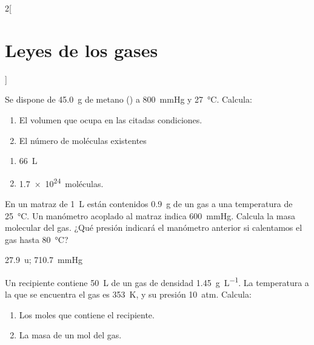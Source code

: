 \documentclass[10pt]{article}
\begin{document}
\begin{multicols}{2}[
  \section{Leyes de los gases}
  ]
  \begin{exercise}[
      tags    = {termodinámica, entalpía, entalpia de reacción, calor},
      topics  = {química, termoquímica, termodinámica},
      source  = {FQ 1B OXF 2015, p60, e22},
    ]
    Se dispone de \SI{45.0}{\gram} de metano () a \SI{800}{\mmHg} y \SI{27}{\celsius}. Calcula:
    \begin{enumerate}
      \item El volumen que ocupa en las citadas condiciones.
      \item El número de moléculas existentes
    \end{enumerate}
  \end{exercise}

  \begin{solution}
    \begin{enumerate}
      \item \SI{66}{\liter}
      \item \SI{1.7e24}{moléculas}.
    \end{enumerate}
  \end{solution}




  \begin{exercise}[
      tags    = {termodinámica, entalpía, entalpia de reacción, calor},
      topics  = {química, termoquímica, termodinámica},
      source  = {FQ 1B OXF 2015, p61, e24-25},
    ]
    En un matraz de \SI{1}{\liter} están contenidos \SI{0.9}{\gram} de un gas a una temperatura de \SI{25}{\celsius}. Un manómetro acoplado al matraz indica \SI{600}{\mmHg}. Calcula la masa  molecular del gas. ¿Qué presión indicará el manómetro anterior si calentamos el gas hasta \SI{80}{\celsius}?
  \end{exercise}

  \begin{solution}
    \SI{27.9}{u}; \SI{710.7}{\mmHg}
  \end{solution}



  \begin{exercise}[
      tags    = {termodinámica, entalpía, entalpia de reacción, calor},
      topics  = {química, termoquímica, termodinámica},
      source  = {FQ 1B OXF 2015, p61, e29},
    ]
    Un recipiente contiene \SI{50}{\liter} de un gas de densidad \SI{1.45}{\gram\per\liter}. La temperatura a la que se encuentra el gas es \SI{353}{\kelvin}, y su presión \SI{10}{atm}. Calcula:
    \begin{enumerate}
      \item Los moles que contiene el recipiente.
      \item La masa de un mol del gas.
    \end{enumerate}
  \end{exercise}


\end{multicols}
\end{document}

